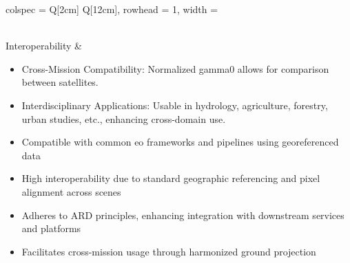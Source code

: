 \begin{longtblr}[
  caption = {Usability, Integrability, and Interoperability of \acs{nrb} product},
  label = {tab:nrb_usability_integrability_interoperability},
]{
  colspec = {Q[2cm] Q[12cm]},
  rowhead = 1,
  width = \linewidth
}
\begin{itemize}
\end{itemize}
\\
Interoperability &
\begin{itemize}
  \item Cross-Mission Compatibility: Normalized \gls{gamma0} allows for comparison between satellites.
  \item Interdisciplinary Applications: Usable in hydrology, agriculture, forestry, urban studies, etc., enhancing cross-domain use.
  \item Compatible with common \acs{eo} frameworks and pipelines using georeferenced data
  \item High interoperability due to standard geographic referencing and pixel alignment across scenes
  \item Adheres to ARD principles, enhancing integration with downstream services and platforms
  \item Facilitates cross-mission usage through harmonized ground projection
\end{itemize}
\\
\hline
\end{longtblr}


